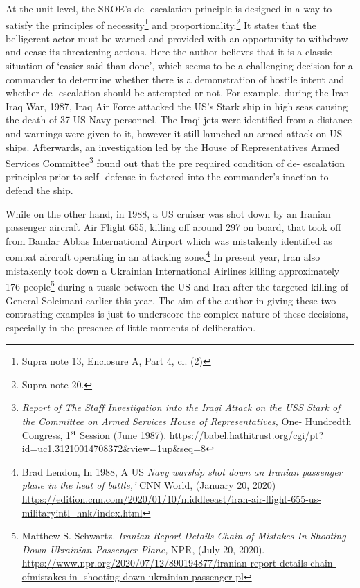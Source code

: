 \begin{multicols}{2}
\noi
At the unit level, the SROE’s de- escalation principle is designed in a way to satisfy the
principles of necessity\footnote{Supra note 13, Enclosure A, Part 4, cl. (2)} and proportionality.\footnote{Supra note 20.}  It states that the belligerent actor must be
warned and provided with an opportunity to withdraw and cease its threatening actions.
Here the author believes that it is a classic situation of ‘easier said than done’, which seems
to be a challenging decision for a commander to determine whether there is a demonstration
of hostile intent and whether de- escalation should be attempted or not. For example,
during the Iran- Iraq War, 1987, Iraq Air Force attacked the US’s Stark ship in high seas causing the death of 37 US Navy personnel. The Iraqi jets were identified from a distance
and warnings were given to it, however it still launched an armed attack on US ships.
Afterwards, an investigation led by the House of Representatives Armed Services
Committee\footnote{\textit{Report of The Staff Investigation into the Iraqi Attack on the USS Stark of the Committee on Armed Services House of Representatives,} One- Hundredth Congress, 1$^{\rm st}$ Session (June 1987).
\url{https://babel.hathitrust.org/cgi/pt?id=uc1.31210014708372&view=1up&seq=8}}  found out that the pre required condition of de- escalation principles prior to
self- defense in factored into the commander’s inaction to defend the ship.


\noi
While on the other hand, in 1988, a US cruiser was shot down by an Iranian passenger
aircraft Air Flight 655, killing off around 297 on board, that took off from Bandar
Abbas International Airport which was mistakenly identified as combat aircraft operating
in an attacking zone.\footnote{Brad Lendon, In 1988, A US \textit{Navy warship shot down an Iranian passenger plane in the heat of battle,’} CNN World, (January 20, 2020)  \url{https://edition.cnn.com/2020/01/10/middleeast/iran-air-flight-655-us-militaryintl- hnk/index.html}} In present year, Iran also mistakenly took down a Ukrainian 
International Airlines killing approximately 176 people\footnote{Matthew S. Schwartz. \textit{Iranian Report Details Chain of Mistakes In Shooting Down Ukrainian Passenger
Plane,} NPR, (July 20, 2020).  \url{https://www.npr.org/2020/07/12/890194877/iranian-report-details-chain-ofmistakes-in- shooting-down-ukrainian-passenger-pl}} during a tussle between the US
and Iran after the targeted killing of General Soleimani earlier this year. The aim of the
author in giving these two contrasting examples is just to underscore the complex nature of
these decisions, especially in the presence of little moments of deliberation.


\end{multicols}
